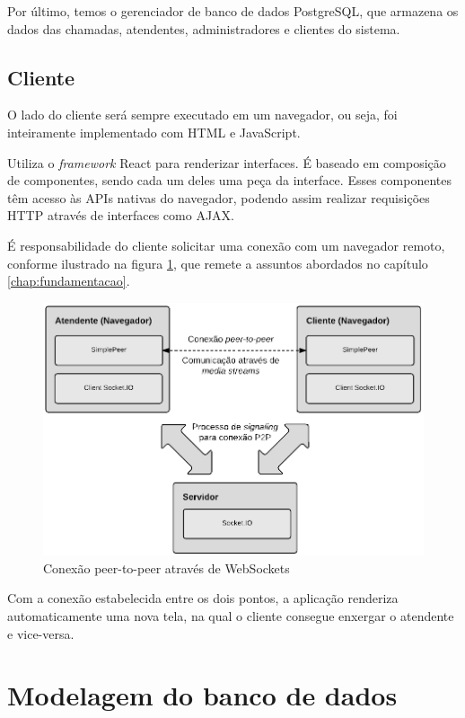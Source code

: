 Por último, temos o gerenciador de banco de dados PostgreSQL, que armazena os dados das chamadas, atendentes, administradores e clientes do sistema.

\subsection{Cliente}

O lado do cliente será sempre executado em um navegador, ou seja, foi inteiramente implementado com HTML e JavaScript. 

Utiliza o \textit{framework} React para renderizar interfaces. É baseado em composição de componentes, sendo cada um deles uma peça da interface. Esses componentes têm acesso às APIs nativas do navegador, podendo assim realizar requisições HTTP através de interfaces como AJAX.

É responsabilidade do cliente solicitar uma conexão  com um navegador remoto, conforme ilustrado na figura \ref{fig:peer_connection}, que remete a assuntos abordados no capítulo \ref{chap:fundamentacao}.

\begin{figure}[ht!]
	\centering
		\includegraphics[scale=0.35]{figures/overview-client.png} 
	\caption{Conexão peer-to-peer através de WebSockets}
	\label{fig:peer_connection}
\end{figure}

Com a conexão estabelecida entre os dois pontos, a aplicação renderiza automaticamente uma nova tela, na qual o cliente consegue enxergar o atendente e vice-versa.

\section{Modelagem do banco de dados}

